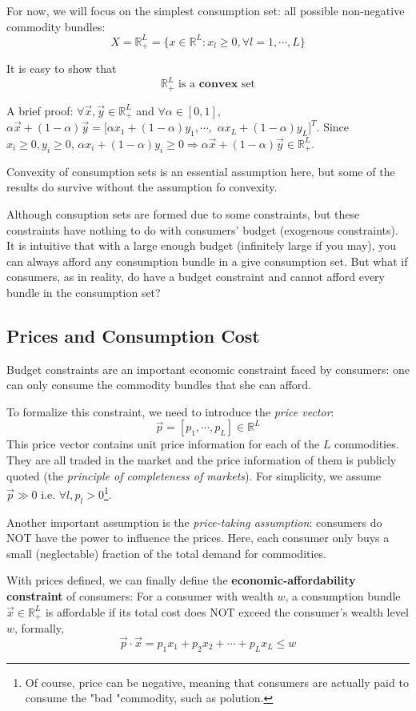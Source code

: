For now, we will focus on the simplest consumption set: all possible non-negative commodity bundles:
$$X=\mathbb{R}^L_+=\{x\in \mathbb{R}^L: x_l\geq 0,\forall l=1,\cdots, L\}$$

It is easy to show that
$$\mathbb{R}^L_+ \text{ is a }\textbf{convex} \text{ set}$$

A brief proof: $\forall \vec{x},\vec{y}\in \mathbb{R}^L_+$ and $\forall\alpha \in [0,1]$, $\alpha\vec{x}+(1-\alpha)\vec{y}=[\alpha x_1+(1-\alpha)y_1,\cdots,$ $\alpha x_L+(1-\alpha)y_L]^T$. Since $x_i\geq 0,y_i\geq 0$, $\alpha x_i+(1-\alpha)y_i\geq 0 \Rightarrow\alpha\vec{x}+(1-\alpha)\vec{y}\in \mathbb{R}^L_+$.

Convexity of consumption sets is an essential assumption here, but some of the results do survive without the assumption fo convexity.

Although consuption sets are formed due to some constraints, but these constraints have nothing to do with consumers' budget (exogenous constraints). It is intuitive that with a large enough budget (infinitely large if you may), you can always afford any consumption bundle in a give consumption set. But what if consumers, as in reality, do have a budget constraint and cannot afford every bundle in the consumption set?

\subsection{Prices and Consumption Cost}
Budget constraints are an important economic constraint faced by consumers: one can only consume the commodity bundles that she can afford.

To formalize this constraint, we need to introduce the \textit{price vector}: 
$$\vec{p}=\left[p_1,\cdots,p_L\right]\in \mathbb{R}^L$$
This price vector contains unit price information for each of the $L$ commodities. They are all traded in the market and the price information of them is publicly quoted (the \textit{principle of completeness of markets}).
For simplicity, we assume $\vec{p}\gg 0$ i.e. $\forall l,p_l>0$\footnote{Of course, price can be negative, meaning that consumers are actually paid to consume the "bad "commodity, such as polution.}.

Another important assumption is the \textit{price-taking assumption}: consumers do NOT have the power to influence the prices. Here, each consumer only buys a small (neglectable) fraction of the total demand for commodities.

With prices defined, we can finally define the \textbf{economic-affordability constraint} of consumers: For a consumer with wealth $w$, a consumption bundle $\vec{x}\in \mathbb{R}^L_+$ is affordable if its total cost does NOT exceed the consumer's wealth level $w$, formally, $$\vec{p}\cdot \vec{x}=p_1x_1+p_2x_2+\cdots+p_Lx_L\leq w$$